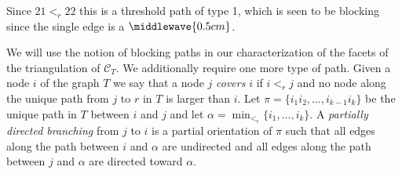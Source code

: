 \begin{example}
\begin{center}
    \end{center}
    Since $21 <_r 22$ this is a threshold path of type 1, which is seen to be blocking since the single edge is a $\middlewave{0.5cm}$. 
\end{example}

We will use the notion of blocking paths in our characterization of the facets of the triangulation of $\mathcal{C}_T$. 
We additionally require one more type of path. 
Given a node $i$ of the graph $T$ we say that a node $j$ \emph{covers} $i$ if $i <_r j$ and no node along the unique path from $j$ to $r$ in $T$ is larger than $i$. 
Let $\pi = \{i_1i_2,\ldots, i_{k-1}i_k\}$ be the unique path in $T$ between $i$ and $j$ and let $\alpha = \min_{<_r}\{i_1,\ldots, i_k\}$. 
A \emph{partially directed branching} from $j$ to $i$ is a partial orientation of $\pi$ such that all edges along the path between $i$ and $\alpha$ are undirected and all edges along the path between $j$ and $\alpha$ are directed toward $\alpha$. 

